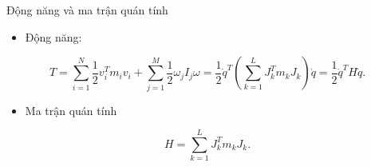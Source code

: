 \begin{frame}{Động năng và ma trận quán tính}
    \begin{itemize}
        \item Động năng:
    \end{itemize}
    \begin{equation}
        T = \sum_{i=1}^N \dfrac{1}{2} v_i^T m_i v_i + \sum_{j=1}^M \dfrac{1}{2} \omega_j I_j \omega = \dfrac{1}{2} \dot{q}^T \left( \sum_{k=1}^L J_k^T m_k J_k \right) \dot{q} = \dfrac{1}{2} \dot{q}^T H \dot{q}.
    \end{equation}
    \begin{itemize}
        \item Ma trận quán tính
    \end{itemize}
    \begin{equation}
        H = \sum_{k=1}^L J_k^T m_k J_k.
    \end{equation}
\end{frame}